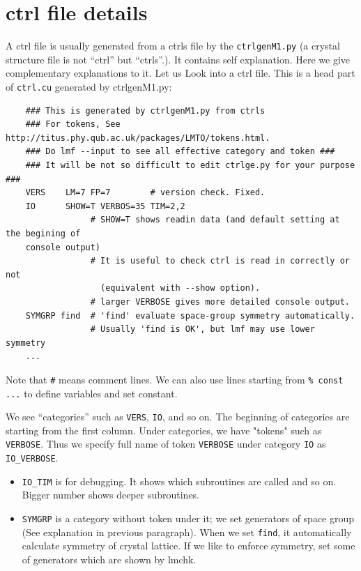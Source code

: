\documentclass[a4paper,10pt,epsf,fleqn]{article}
\begin{document}
{%
\section{ctrl file details}
A ctrl file is usually generated from a ctrls file by the \verb+ctrlgenM1.py+
(a crystal structure file is not ``ctrl'' but ``ctrls''.).
It contains self explanation.
Here we give complementary explanations to it.
Let us Look into a ctrl file. This is a head part of \verb+ctrl.cu+ generated by ctrlgenM1.py:
\begin{verbatim}
    ### This is generated by ctrlgenM1.py from ctrls 
    ### For tokens, See http://titus.phy.qub.ac.uk/packages/LMTO/tokens.html. 
    ### Do lmf --input to see all effective category and token ###
    ### It will be not so difficult to edit ctrlge.py for your purpose ###
    VERS    LM=7 FP=7        # version check. Fixed.
    IO      SHOW=T VERBOS=35 TIM=2,2
                 # SHOW=T shows readin data (and default setting at the begining of 
    console output)
                 # It is useful to check ctrl is read in correctly or not
                   (equivalent with --show option).
                 # larger VERBOSE gives more detailed console output.
    SYMGRP find  # 'find' evaluate space-group symmetry automatically.
                 # Usually 'find is OK', but lmf may use lower symmetry
    ...
\end{verbatim}
Note that \verb+#+ means comment lines. We can also use
lines starting from \verb+% const ...+ to define variables and set constant.

We see ``categories'' such as \verb+VERS+, \verb+IO+, and so on.
The beginning of categories are starting from the first column.
Under categories, we have "tokens" such as \verb+VERBOSE+.
Thus we specify full name of token \verb+VERBOSE+ under category
\verb+IO+ as \verb+IO_VERBOSE+.


\begin{itemize}
\item
\verb+IO_TIM+ is for debugging. It shows which subroutines are
called and so on. Bigger number shows deeper subroutines.

\item
\verb+SYMGRP+ is a category without token under it; 
we set generators of space group (See explanation in previous paragraph).
When we set \verb+find+, it automatically calculate symmetry of crystal lattice.
If we like to enforce symmetry, set some of generators which are shown by lmchk.



\end{itemize}}
\end{document}
